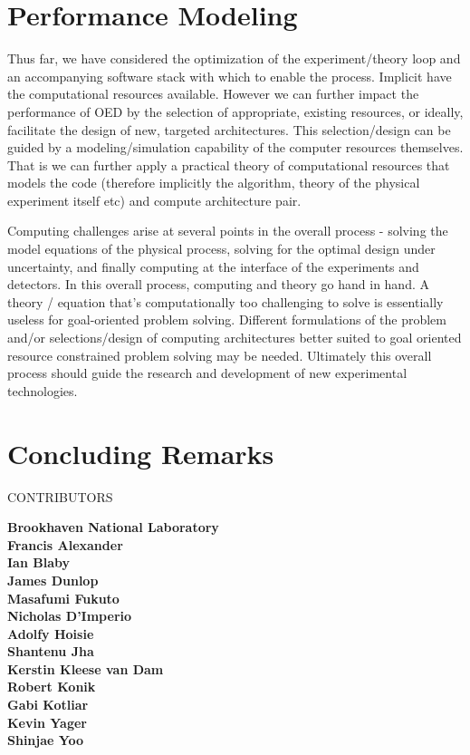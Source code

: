 \documentclass[11pt]{article}
\begin{document}
\section{Performance Modeling}

Thus far, we have considered the optimization of the experiment/theory
loop and an accompanying software stack with which to enable the
process.  Implicit have the computational resources available.
However we can further impact the performance of OED by the selection
of appropriate, existing resources, or ideally, facilitate the design
of new, targeted architectures.  This selection/design can be guided
by a modeling/simulation capability of the computer resources
themselves. That is we can further apply a practical theory of
computational resources that models the code (therefore implicitly the
algorithm, theory of the physical experiment itself etc) and compute
architecture pair.

Computing challenges arise at several points in the overall process -
solving the model equations of the physical process, solving for the
optimal design under uncertainty, and finally computing at the
interface of the experiments and detectors.  In this overall process,
computing and theory go hand in hand. A theory / equation that's
computationally too challenging to solve is essentially useless for
goal-oriented problem solving.  Different formulations of the problem
and/or selections/design of computing architectures better suited to
goal oriented resource constrained problem solving may be needed.
Ultimately this overall process should guide the research and
development of new experimental technologies.

\section{Concluding Remarks}

\newpage

\begin{center}
CONTRIBUTORS 
\normalsize 
\end{center}

\bf{Brookhaven National Laboratory}\\
Francis Alexander\\ 
Ian Blaby\\
James Dunlop\\
Masafumi Fukuto\\
Nicholas D'Imperio\\
Adolfy Hoisie\\
Shantenu Jha\\
Kerstin Kleese van Dam\\
Robert Konik\\
Gabi Kotliar\\
Kevin Yager\\
Shinjae Yoo \\
\end{document}
